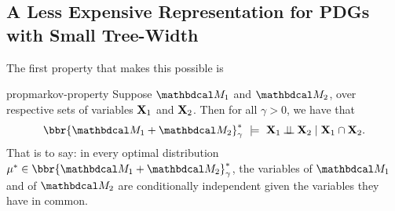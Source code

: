 \documentclass[twoside]{article}
\begin{document}




\subsection{A Less Expensive Representation for PDGs with Small Tree-Width}
    \label{sec:clique-tree-expcone}

The first property that makes this possible is 

\begin{linked}{prop}{markov-property}
	Suppose $\dg M_1$ and $\dg M_2$, over respective sets of variables $\mathbf{X}_1$ and $\mathbf{X}_2$.
	Then for all $\gamma > 0$, we have that
	\[
	 	\bbr{\dg M_1 \bundle \dg M_2}^*_\gamma
			~\models~
		\mat X_1 \mathbin{\bot\!\!\!\bot} \mat X_2 \mid \mat X_1 \cap \mat X_2.
	\]
	That is to say: in every optimal distribution $\mu^* \in \bbr{\dg M_1 \bundle \dg M_2}^*_\gamma$,
    the variables of $\dg M_1$ and of $\dg M_2$ are conditionally independent given the variables they have in common.
\end{linked}
\end{document}

